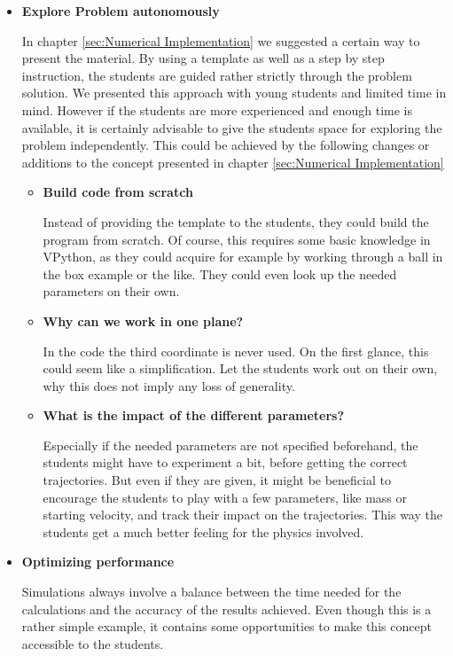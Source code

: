 \documentclass[12pt]{iopart}
\begin{document}
\begin{itemize}

\item \textbf{Explore Problem autonomously}

In chapter \ref{sec:Numerical Implementation} we suggested a certain way to present the material. By using a template as well as a step by step instruction, the students are guided rather strictly through the problem solution. We presented this approach with young students and limited time in mind. However if the students are more experienced and enough time is available, it is certainly advisable to give the students space for exploring the problem independently. This could be achieved by the following changes or additions to the concept presented in chapter \ref{sec:Numerical Implementation}

\begin{itemize}
\item \textbf{Build code from scratch}

Instead of providing the template to the students, they could build the program from scratch. Of course, this requires some basic knowledge in VPython, as they could acquire for example by working through a ball in the box example or the like. They could even look up the needed parameters on their own.
\item \textbf{Why can we work in one plane?}

In the code the third coordinate is never used. On the first glance, this could seem like a simplification. Let the students work out on their own, why this does not imply any loss of generality.
\item \textbf{What is the impact of the different parameters?}

Especially if the needed parameters are not specified beforehand, the students might have to experiment a bit, before getting the correct trajectories. But even if they are given, it might be beneficial to encourage the students to play with a few parameters, like mass or starting velocity, and track their impact on the trajectories. This way the students get a much better feeling for the physics involved.
\end{itemize}

\item \textbf{Optimizing performance}

Simulations always involve a balance between the time needed for the calculations and the accuracy of the results achieved. Even though this is a rather simple example, it contains some opportunities to make this concept accessible to the students.


\end{itemize}
\end{document}
